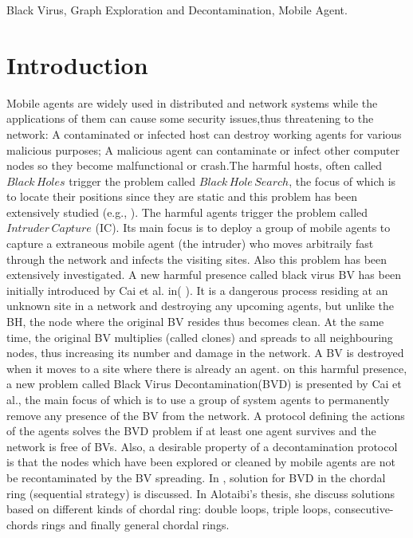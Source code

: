 \documentclass[conference]{IEEEtran}
\begin{document}
\begin{IEEEkeywords}
Black Virus, Graph Exploration and Decontamination, Mobile Agent.
\end{IEEEkeywords}

\section{Introduction}
Mobile agents are widely used in distributed and network systems while the applications of them can cause some security issues,thus threatening to the network: A contaminated or infected host can destroy working agents for various malicious purposes; A malicious agent can contaminate or infect other computer nodes so they become malfunctional or crash.The harmful hosts, often called $Black\,Holes$ trigger the problem called $Black\,Hole\,Search$, the focus of which is to locate their positions since they are static and this problem has been extensively studied (e.g.,          ). The harmful agents trigger the problem called $Intruder\,Capture$ (IC). Its main focus is to deploy a group of mobile agents to capture a extraneous mobile agent (the intruder) who moves arbitraily fast through the network and infects the visiting sites. Also this problem has been extensively investigated.
A new harmful presence called black virus BV has been initially introduced by Cai et al. in(               ). It is a dangerous process residing at an unknown site in a network and destroying any upcoming agents, but unlike the BH, the node where the original BV resides thus becomes clean. At the same time, the original BV multiplies (called clones) and spreads to all neighbouring nodes, thus increasing its number and damage in the network. A BV is destroyed when it moves to a site where there is already an agent. on this harmful presence, a new problem called Black Virus Decontamination(BVD) is presented by Cai et al., the main focus of which is to use a group of system agents to permanently remove any presence of the BV from the network. A protocol defining the actions of the agents solves the BVD problem if at least one agent survives and the network is free of BVs. Also, a desirable property of a decontamination protocol is that the nodes which have been explored or cleaned by mobile agents are not be recontaminated by the BV spreading. In \cite{Alotaibi}, solution for BVD in the chordal ring (sequential strategy) is discussed. In Alotaibi's thesis, she discuss solutions based on different kinds of chordal ring: double loops, triple loops, consecutive-chords rings and finally general chordal rings. \\
\end{document}
